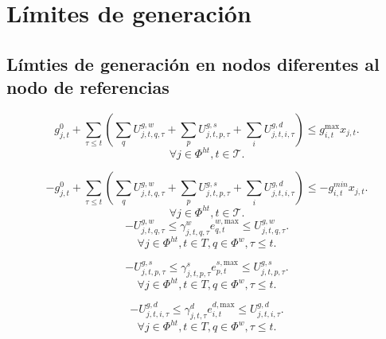 \chapter{Límites de generación}

\section{Límties de generación en nodos diferentes al nodo de referencias}

\begin{equation}
g^{0}_{j,t} + \sum_{\tau \le t} \left( \sum_{q}U^{g,w}_{j,t,q,\tau} + \sum_{p}U^{g,s}_{j,t,p,\tau} + \sum_{i}U^{g,d}_{j,t,i,\tau} \right ) \le g^{\text{max}}_{i,t}x_{j,t}.
\end{equation}
\begin{equation*}
    \forall j \in \Phi^{ht},t \in \mathcal{T}.
\end{equation*}

\begin{equation}
-g^{0}_{j,t} + \sum_{\tau \le t} \left( \sum_{q}U^{g,w}_{j,t,q,\tau} + \sum_{p}U^{g,s}_{j,t,p,\tau} + \sum_{i}U^{g,d}_{j,t,i,\tau} \right ) \le -g^{min}_{i,t}x_{j,t}.
\end{equation}
\begin{equation*}
    \forall j \in \Phi^{ht},t \in \mathcal{T}.
\end{equation*}
%
\begin{equation}
-U^{g,w}_{j,t,q,\tau} \le \gamma^{w}_{j,t,q,\tau} e^{w, \text{max}}_{q,t} \leq U^{g,w}_{j,t,q,\tau}.
\end{equation}
\begin{equation*}
    \forall j \in \Phi^{ht}, t \in T,q \in \Phi^{w},\tau \le t.
\end{equation*}

\begin{equation}
-U^{g,s}_{j,t,p,\tau} \le \gamma^{s}_{j,t,p,\tau} e^{s, \text{max}}_{p,t} \leq U^{g,s}_{j,t,p,\tau}.
\end{equation}
\begin{equation*}
    \forall j \in \Phi^{ht},t \in T,q \in \Phi^{w},\tau \le t.
\end{equation*}

\begin{equation}
-U^{g,d}_{j,t,i,\tau} \leq \gamma^{d}_{j,t,\tau} e^{d, \text{max}}_{i,t} \leq U^{g,d}_{j,t,i,\tau}.
\end{equation}
\begin{equation*}
    \forall j \in \Phi^{ht},t \in T,q \in \Phi^{w},\tau \le t.
\end{equation*}

